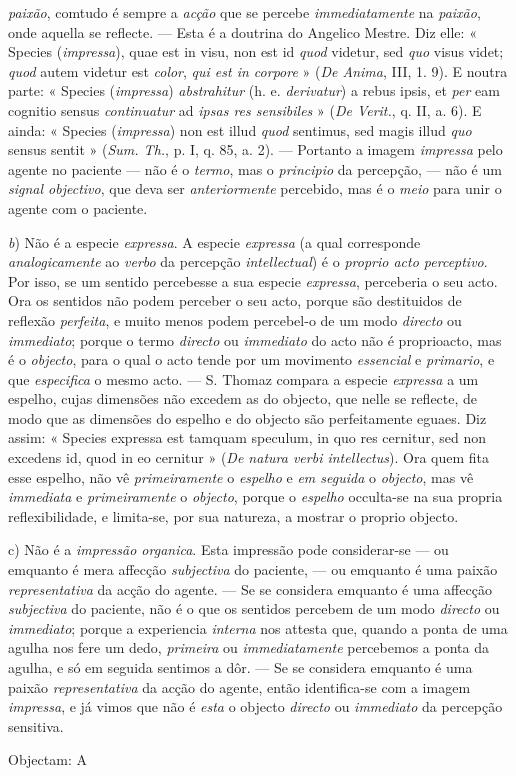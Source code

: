 \emph{paixão}, comtudo é sempre a \emph{acção} que se percebe \emph{immediatamente} na \emph{paixão}, onde aquella se reflecte. --- Esta é a doutrina do Angelico Mestre. Diz elle: « Species (\emph{impressa}), quae est in visu, non est id \emph{quod} videtur, sed \emph{quo} visus videt; \emph{quod} autem videtur est \emph{color}, \emph{qui est in corpore} » (\emph{De Anima}, III, 1. 9). E noutra parte: « Species (\emph{impressa}) \emph{abstrahitur} (h. e. \emph{derivatur}) a rebus ipsis, et \emph{per} eam cognitio sensus \emph{continuatur} ad \emph{ipsas res sensibiles} » (\emph{De Verit.}, q. II, a. 6). E ainda: « Species (\emph{impressa}) non est illud \emph{quod} sentimus, sed magis illud \emph{quo} sensus sentit » (\emph{Sum. Th.}, p. I, q. 85, a. 2). --- Portanto a imagem \emph{impressa} pelo agente no paciente --- não é o \emph{termo}, mas o \emph{principio} da percepção, --- não é um \emph{signal objectivo}, que deva ser \emph{anteriormente} percebido, mas é o \emph{meio} para unir o agente com o paciente.\par \emph{b}) Não é a especie \emph{expressa}. A especie \emph{expressa} (a qual corresponde \emph{analogicamente} ao \emph{verbo} da percepção \emph{intellectual}) é o \emph{proprio acto perceptivo}. Por isso, se um sentido percebesse a sua especie \emph{expressa}, perceberia o seu acto. Ora os sentidos não podem perceber o seu acto, porque são destituidos de reflexão \emph{perfeita}, e muito menos podem percebel-o de um modo \emph{directo} ou \emph{immediato}; porque o termo \emph{directo} ou \emph{immediato} do acto não é proprioacto, mas é o \emph{objecto}, para o qual o acto tende por um movimento \emph{essencial} e \emph{primario}, e que \emph{especifica} o mesmo acto. --- S. Thomaz compara a especie \emph{expressa} a um espelho, cujas dimensões não excedem as do objecto, que nelle se reflecte, de modo que as dimensões do espelho e do objecto são perfeitamente eguaes. Diz assim: « Species expressa est tamquam speculum, in quo res cernitur, sed non excedens id, quod in eo cernitur » (\emph{De natura verbi intellectus}). Ora quem fita esse espelho, não vê \emph{primeiramente} o \emph{espelho} e \emph{em seguida} o \emph{objecto}, mas vê \emph{immediata} e \emph{primeiramente} o \emph{objecto}, porque o \emph{espelho} occulta-se na sua propria reflexibilidade, e limita-se, por sua natureza, a mostrar o proprio objecto.\par c) Não é a \emph{impressão organica}. Esta impressão pode considerar-se --- ou emquanto é mera affecção \emph{subjectiva} do paciente, --- ou emquanto é uma paixão \emph{representativa} da acção do agente. --- Se se considera emquanto é uma affecção \emph{subjectiva} do paciente, não é o que os sentidos percebem de um modo \emph{directo} ou \emph{immediato}; porque a experiencia \emph{interna} nos attesta que, quando a ponta de uma agulha nos fere um dedo, \emph{primeira} ou \emph{immediatamente} percebemos a ponta da agulha, e só em seguida sentimos a dôr. --- Se se considera emquanto é uma paixão \emph{representativa} da acção do agente, então identifica-se com a imagem \emph{impressa}, e já vimos que não é \emph{esta} o objecto \emph{directo} ou \emph{immediato} da percepção sensitiva.\par Objectam: A 